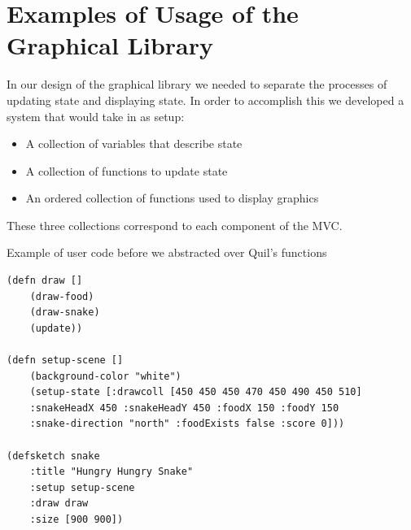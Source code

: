 \documentclass[12pt]{article}
\newcommand{\comment}[1]{}
\newcommand{\todo}[1]{\textcolor{blue}{\comment{To Do: {#1}}}}
\newcommand{\pscomment}[1]{\textcolor{red}{\comment{Paul: {#1}}}}
\begin{document}
%


\section{Examples of Usage of the Graphical Library}\label{sec:usage}

In our design of the graphical library we needed to separate the processes of updating state and displaying state. In order to accomplish this we developed a system that would take in as setup:
\begin{itemize}
	\item A collection of variables that describe state
	\item A collection of functions to update state
	\item An ordered collection of functions used to display graphics
\end{itemize}
These three collections correspond to each component of the MVC.

Example of user code before we abstracted over Quil's functions
\begin{verbatim}
(defn draw []
	(draw-food)
	(draw-snake)
	(update))

(defn setup-scene []
	(background-color "white")
	(setup-state [:drawcoll [450 450 450 470 450 490 450 510] 
	:snakeHeadX 450 :snakeHeadY 450 :foodX 150 :foodY 150 
	:snake-direction "north" :foodExists false :score 0]))

(defsketch snake 
	:title "Hungry Hungry Snake"
	:setup setup-scene
	:draw draw 
	:size [900 900])
\end{verbatim}
\end{document}
